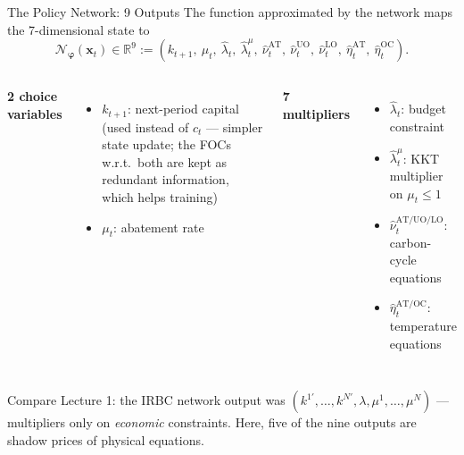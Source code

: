 \documentclass[aspectratio=169,11pt]{beamer}
\newcommand{\emphc}[1]{\textcolor{harvardcrimson}{#1}}
\newcommand{\x}{\bm{x}}
\newcommand{\R}{\mathbb{R}}
\newcommand{\nn}{\mathcal{N}_{\bm{\varphi}}}
\begin{document}
\begin{frame}{The Policy Network: 9 Outputs}
The function approximated by the network maps the 7-dimensional state to
\[
\nn(\x_t) \in \R^{9} := \left(k_{t+1},\ \mu_t,\ \hat{\lambda}_{t},\ \hat{\lambda}^{\mu}_{t},\ \hat{\nu}^{\text{AT}}_{t},\ \hat{\nu}^{\text{UO}}_{t},\ \hat{\nu}^{\text{LO}}_{t},\ \hat{\eta}^{\text{AT}}_{t},\ \hat{\eta}^{\text{OC}}_{t} \right).
\]

\begin{columns}[T]
\textbf{2 choice variables}
\begin{itemize}
    \item $k_{t+1}$: next-period capital (used instead of $c_t$ --- simpler state update; the FOCs w.r.t.\ both are kept as \emphc{redundant information}, which helps training)
    \item $\mu_t$: abatement rate
\end{itemize}

\textbf{7 multipliers}
\begin{itemize}
    \item $\hat{\lambda}_t$: budget constraint
    \item $\hat{\lambda}^{\mu}_t$: KKT multiplier on $\mu_t \leq 1$
    \item $\hat{\nu}^{\text{AT/UO/LO}}_t$: carbon-cycle equations
    \item $\hat{\eta}^{\text{AT/OC}}_t$: temperature equations
\end{itemize}
\end{columns}

\vspace{0.3cm}
{\small Compare Lecture 1: the IRBC network output was $(k^{1\prime}, \ldots, k^{N\prime}, \lambda, \mu^1, \ldots, \mu^N)$ --- multipliers only on \emph{economic} constraints. Here, five of the nine outputs are shadow prices of \emphc{physical} equations.}
\end{frame}
\end{document}
